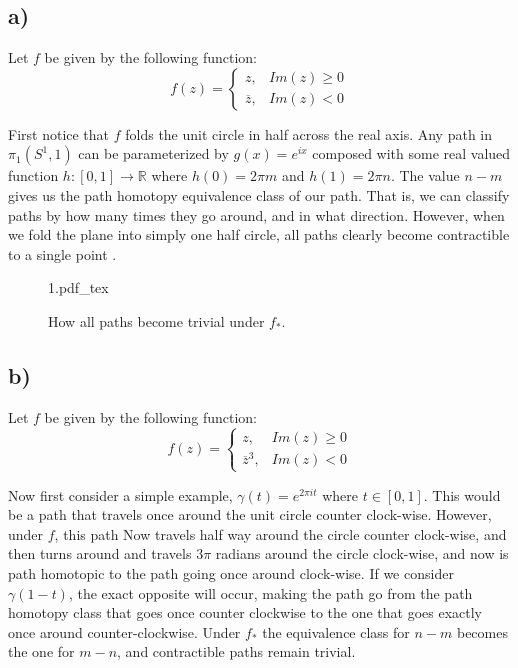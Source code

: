 \documentclass{article}
\newcommand{\incfig}[1]{%
    \def\svgwidth{.5\linewidth}
    {#1.pdf_tex}
}
\theoremstyle{definition}
\begin{document}
    \subsection*{a)}
        \begin{mdframed}
            Let $f$ be given by the following function:
            \[
                f(z) = \begin{cases}
                    z, & Im(z) \geqslant 0 \\
                    \overline z, & Im(z) < 0
                \end{cases}
            \]
        \end{mdframed}
        First notice that $f$ folds the unit circle in half across the real axis. Any path in $\pi_1(S^1, 1)$
        can be parameterized by $g(x) = e^{ix}$ composed with some real valued function $h : [0,1] \rightarrow \mathbb{R}$
        where $h(0) = 2\pi m$ and $h(1) = 2\pi n$. The value $n - m$ gives us the path homotopy equivalence class of our path.
        That is, we can classify paths by how many times they go around, and in what direction. However, when we fold the plane
        into simply one half circle, all paths clearly become contractible to a single point .
        \begin{figure}[ht]
            \centering
            \incfig{1}
            \caption{How all paths become trivial under $f_*$.}
            \label{fig:1}
        \end{figure}
    \subsection*{b)}
        \begin{mdframed}
            Let $f$ be given by the following function:
            \[
                f(z) = \begin{cases}
                    z, & Im(z) \geqslant 0 \\
                    {\overline z}^3, & Im(z) < 0
                \end{cases}
            \]
        \end{mdframed}
        Now first consider a simple example, $\gamma(t) = e^{2\pi i t}$ where $t \in [0,1]$. This would be 
        a path that travels once around the unit circle counter clock-wise. However, under $f$, this path Now
        travels half way around the circle counter clock-wise, and then turns around and travels $3\pi$ radians around 
        the circle clock-wise, and now is path homotopic to the path going once around clock-wise. If we consider $\gamma(1-t)$,
        the exact opposite will occur, making the path go from the path homotopy class that goes once counter clockwise to 
        the one that goes exactly once around counter-clockwise. Under $f_*$ the equivalence class for $n - m$ becomes the one for $m - n$,
        and contractible paths remain trivial.
\end{document}
